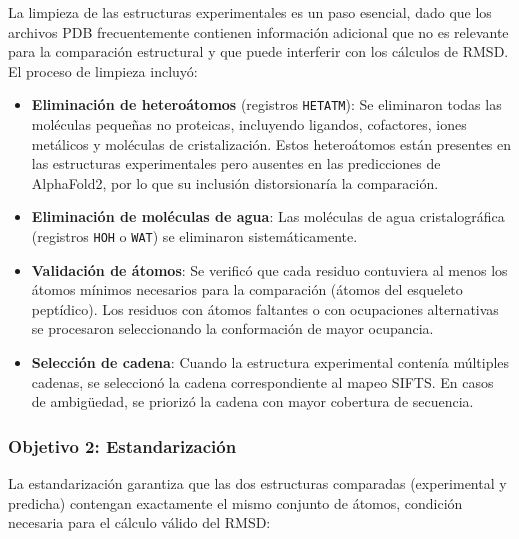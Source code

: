 La limpieza de las estructuras experimentales es un paso esencial, dado que los archivos PDB frecuentemente contienen informaci\'on adicional que no es relevante para la comparaci\'on estructural y que puede interferir con los c\'alculos de RMSD. El proceso de limpieza incluy\'o:

\begin{itemize}
    \item \textbf{Eliminaci\'on de hetero\'atomos} (registros \texttt{HETATM}): Se eliminaron todas las mol\'eculas peque\~nas no proteicas, incluyendo ligandos, cofactores, iones met\'alicos y mol\'eculas de cristalizaci\'on. Estos hetero\'atomos est\'an presentes en las estructuras experimentales pero ausentes en las predicciones de AlphaFold2, por lo que su inclusi\'on distorsionar\'ia la comparaci\'on.

    \item \textbf{Eliminaci\'on de mol\'eculas de agua}: Las mol\'eculas de agua cristalogr\'afica (registros \texttt{HOH} o \texttt{WAT}) se eliminaron sistem\'aticamente.

    \item \textbf{Validaci\'on de \'atomos}: Se verific\'o que cada residuo contuviera al menos los \'atomos m\'inimos necesarios para la comparaci\'on (\'atomos del esqueleto pept\'idico). Los residuos con \'atomos faltantes o con ocupaciones alternativas se procesaron seleccionando la conformaci\'on de mayor ocupancia.

    \item \textbf{Selecci\'on de cadena}: Cuando la estructura experimental conten\'ia m\'ultiples cadenas, se seleccion\'o la cadena correspondiente al mapeo SIFTS. En casos de ambig\"uedad, se prioriz\'o la cadena con mayor cobertura de secuencia.
\end{itemize}

\subsubsection{Objetivo 2: Estandarizaci\'on}
\label{subsubsec:estandarizacion}

La estandarizaci\'on garantiza que las dos estructuras comparadas (experimental y predicha) contengan exactamente el mismo conjunto de \'atomos, condici\'on necesaria para el c\'alculo v\'alido del RMSD:

